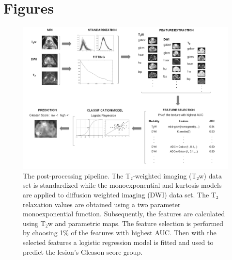 \section{Figures}

\begin{figure}[ht]

\centering \includegraphics[width=1.0\textwidth]{figures/fig1}

\caption{The post-processing pipeline. The T₂-weighted imaging (T₂w) data set
is standardized while the monoexponential and kurtosis models are applied to
diffusion weighted imaging (DWI) data set. The T₂ relaxation values are obtained
using a two parameter monoexponential function. Subsequently, the features are
calculated using T₂w and parametric maps. The feature selection is performed
by choosing 1\% of the features with highest AUC\@. Then with the selected
features a logistic regression model is fitted and used to predict the lesion's
Gleason score group.}\label{fig:pipeline}

\end{figure}



